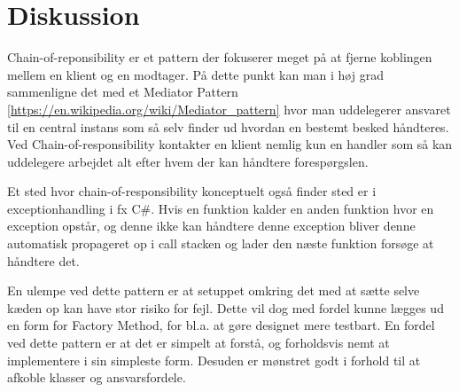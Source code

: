 \chapter{Diskussion}
Chain-of-reponsibility er et pattern der fokuserer meget på at fjerne koblingen mellem en klient og en modtager. På dette punkt kan man i høj grad sammenligne det med et Mediator Pattern \ref{https://en.wikipedia.org/wiki/Mediator_pattern} hvor man uddelegerer ansvaret til en central instans som så selv finder ud hvordan en bestemt besked håndteres.
Ved Chain-of-responsibility kontakter en klient nemlig kun en handler som så kan uddelegere arbejdet alt efter hvem der kan håndtere forespørgslen.

Et sted hvor chain-of-responsibility konceptuelt også finder sted er i exceptionhandling i fx C\#. Hvis en funktion kalder en anden funktion hvor en exception opstår, og denne ikke kan håndtere denne exception bliver denne automatisk propageret op i call stacken og lader den næste funktion forsøge at håndtere det. 

En ulempe ved dette pattern er at setuppet omkring det med at sætte selve kæden op kan have stor risiko for fejl. Dette vil dog med fordel kunne lægges ud en form for Factory Method, for bl.a. at gøre designet mere testbart. En fordel ved dette pattern er at det er simpelt at forstå, og forholdsvis nemt at implementere i sin simpleste form. Desuden er mønstret godt i forhold til at afkoble klasser og ansvarsfordele.